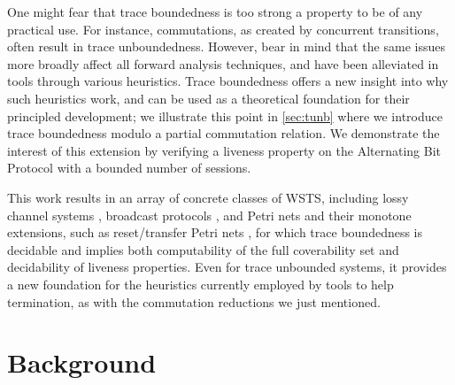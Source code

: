 \documentclass[11pt,reqno,a4paper]{amsart}
\renewcommand{\cite}{\citep}
\theoremstyle{plain}
\theoremstyle{definition}
\theoremstyle{remark}
\renewcommand{\paragraph}{\subsubsection*}
\begin{document}
One might fear that trace boundedness is too strong a property to be of any
practical use.  For instance, commutations, as created by concurrent
transitions, often result in trace unboundedness.  However, bear in
mind that the same issues more broadly affect all forward analysis
techniques, and have been alleviated in tools through various
heuristics.  Trace boundedness offers a new insight into why such
heuristics work, and can be used as a theoretical foundation for their
principled development; we illustrate this point in \autoref{sec:tunb}
where we introduce trace boundedness modulo a partial commutation
relation.  We demonstrate the interest of this extension by verifying
a liveness property on the Alternating Bit Protocol with a bounded
number of sessions.

This work results in an array of concrete classes of WSTS, including
lossy channel systems \cite{lcs}, broadcast protocols \cite{emerson},
and Petri nets and their monotone extensions, such as reset/transfer
Petri nets \cite{boundedRPN}, for which trace boundedness is decidable
and implies both computability of the full coverability set and
decidability of liveness properties.  Even for trace unbounded
systems, it provides a new foundation for the heuristics currently
employed by tools to help termination, as with the commutation
reductions we just mentioned.

\renewcommand{\paragraph}{\subsubsection}
\section{Background}\label{sec:prelim}
\end{document}
